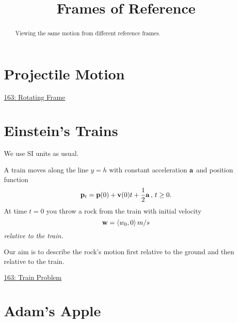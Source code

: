 \documentclass{ximera}
\title{Frames of Reference}
\begin{document}
\begin{abstract}
Viewing the same motion from different reference frames.
\end{abstract}
\maketitle


\section{Projectile Motion}
\begin{question}  \label{Qdsf435r45te}

\begin{onlineOnly}
    \begin{center}
\end{center}
\end{onlineOnly}

\href{https://www.desmos.com/3d/sqvm9cvfyd}{163: Rotating Frame}


\end{question}


\section{Einstein's Trains}
\begin{question}  \label{Qsdfds44445te}
We use SI units as usual.

A train moves along the line $y=h$ with constant acceleration ${\bf a}$ and position function
\[
 {\bf p}_t = {\bf p}(0) + {\bf v}(0)t + \frac{1}{2} {\bf a} \, , \, t\geq 0 .
\]
At time $t=0$ you throw a rock from the train with initial velocity
\[
         {\bf w} = \langle w_0, 0 \rangle \, m/s
\]
\emph{relative to the train.}

Our aim is to describe the rock's motion first relative to the ground and then relative to the train.

\begin{onlineOnly}
    \begin{center}
\end{center}
\end{onlineOnly}

\href{https://www.desmos.com/calculator/uzywalzuny}{163: Train Problem}


\end{question}

\section{Adam's Apple}
\end{document}

